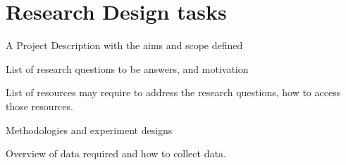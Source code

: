 \section{Research Design tasks}
\begin{todolist}
    \item[\done] A Project Description with the aims and scope defined
    \item[\done] List of research questions to be answers, and motivation
    \item List of resources may require to address the research questions, how to access those resources.
    \item Methodologies and experiment designs
    \item Overview of data required and how to collect data.
\end{todolist}

